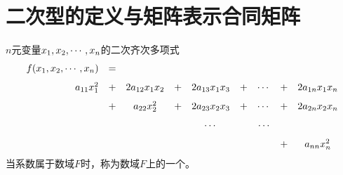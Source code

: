\section{二次型的定义与矩阵表示\quad 合同矩阵}

\begin{frame}
  
  \begin{dingyi}[二次型]
    $n$元变量$x_1,x_2,\cdots,x_n$的二次齐次多项式
    \begin{equation}\label{qf}
    \begin{array}{rcccccccc}
      f(x_1,x_2,\cdots,x_n) &=& \\[0.1in]
      a_{11}x_1^2&+&2a_{12}x_1x_2&+&2a_{13}x_1x_3&+&\cdots&+&2a_{1n}x_1x_n\\[0.1in]
                         &+&a_{22}x_2^2&+&2a_{23}x_2x_3&+&\cdots&+&2a_{2n}x_2x_n\\[0.1in]
                         &&&&\cdots&&\cdots\\[0.1in]
                         &&&&&&&+&a_{nn}x_n^2
    \end{array}
    \end{equation}
    当系数属于数域$F$时，称为数域$F$上的一个。
  \end{dingyi}
  
\end{frame}



